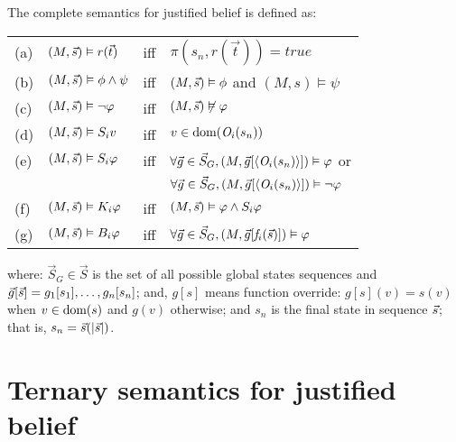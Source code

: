 \documentclass[letterpaper]{article} %
\begin{document}
\begin{definition}
The complete semantics for justified belief is defined as:

\vspace{2mm}
\noindent
\begin{tabular}{llll}
 (a) & $(M,\Vec{s}) \vDash r(\Vec{t})$      & iff & $\pi(s_n, r(\Vec{t})) = true$\\[1mm]
 (b) & $(M,\Vec{s}) \vDash \phi \land \psi$ & iff & $(M,\Vec{s}) \vDash \phi$ and $(M,s) \vDash \psi$\\[1mm]
 (c) & $(M,\Vec{s}) \vDash \neg \varphi$    & iff & $(M,\Vec{s}) \not\vDash \varphi$\\[1mm]
 (d) & $(M,\Vec{s}) \vDash S_i v$           & iff & $v \in \textrm{dom}(\mathit{O}_i(s_n))$\\[1mm]
 (e) & $(M,\Vec{s}) \vDash S_i \varphi$     & iff & $\forall \vec{g} \in \vec{S}_G, (M,  \vec{g}[\langle\mathit{O}_i(s_n)\rangle] ) \vDash \varphi$ or \\
     &                                   &     & $\forall \vec{g} \in \vec{S}_G, (M,  \vec{g}[\langle\mathit{O}_i(s_n)\rangle] ) \vDash \neg\varphi$\\[1mm]
 (f) & $(M,\Vec{s}) \vDash K_i\varphi$      & iff & $(M, \Vec{s} ) \vDash \varphi \land S_i \varphi$\\[1mm]
 (g) & $(M,\Vec{s}) \vDash B_i \varphi$       & iff & $\forall \vec{g} \in \vec{S}_G, (M,  \vec{g}[\mathit{f}_i(\Vec{s})]) \vDash \varphi$  \\[1mm]
\end{tabular}
\vspace{2mm}

\noindent where: $\vec{S}_G \in \vec{S}$ is the set of all possible global states sequences and $\vec{g}[\Vec{s}] = g_1[s_1],\dots,g_n[s_n]$; and, $g[s]$ means function override: $g[s](v) = s(v)$ when $v \in \textrm{dom}(s)$ and $g(v)$ otherwise; and $s_n$ is the final state in sequence $\Vec{s}$; that is, $s_n = \Vec{s}(|\Vec{s}|)$.
\end{definition}

\section{Ternary semantics for justified belief}
\end{document}
